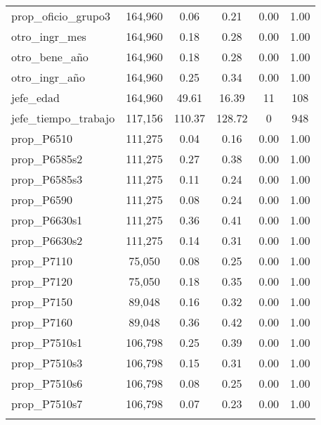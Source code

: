 \begin{table}[!htbp]
\begin{tabular}{@{\extracolsep{5pt}}lccccc}
prop\_oficio\_grupo3 & 164,960 & 0.06 & 0.21 & 0.00 & 1.00 \\ 
otro\_ingr\_mes & 164,960 & 0.18 & 0.28 & 0.00 & 1.00 \\ 
otro\_bene\_año & 164,960 & 0.18 & 0.28 & 0.00 & 1.00 \\ 
otro\_ingr\_año & 164,960 & 0.25 & 0.34 & 0.00 & 1.00 \\ 
jefe\_edad & 164,960 & 49.61 & 16.39 & 11 & 108 \\ 
jefe\_tiempo\_trabajo & 117,156 & 110.37 & 128.72 & 0 & 948 \\ 
prop\_P6510 & 111,275 & 0.04 & 0.16 & 0.00 & 1.00 \\ 
prop\_P6585s2 & 111,275 & 0.27 & 0.38 & 0.00 & 1.00 \\ 
prop\_P6585s3 & 111,275 & 0.11 & 0.24 & 0.00 & 1.00 \\ 
prop\_P6590 & 111,275 & 0.08 & 0.24 & 0.00 & 1.00 \\ 
prop\_P6630s1 & 111,275 & 0.36 & 0.41 & 0.00 & 1.00 \\ 
prop\_P6630s2 & 111,275 & 0.14 & 0.31 & 0.00 & 1.00 \\ 
prop\_P7110 & 75,050 & 0.08 & 0.25 & 0.00 & 1.00 \\ 
prop\_P7120 & 75,050 & 0.18 & 0.35 & 0.00 & 1.00 \\ 
prop\_P7150 & 89,048 & 0.16 & 0.32 & 0.00 & 1.00 \\ 
prop\_P7160 & 89,048 & 0.36 & 0.42 & 0.00 & 1.00 \\ 
prop\_P7510s1 & 106,798 & 0.25 & 0.39 & 0.00 & 1.00 \\ 
prop\_P7510s3 & 106,798 & 0.15 & 0.31 & 0.00 & 1.00 \\ 
prop\_P7510s6 & 106,798 & 0.08 & 0.25 & 0.00 & 1.00 \\ 
prop\_P7510s7 & 106,798 & 0.07 & 0.23 & 0.00 & 1.00 \\ 
\hline \\[-1.8ex] 
\end{tabular} 
\end{table} 
